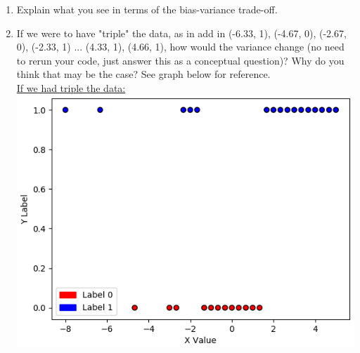 \documentclass[submit]{harvardml}
\begin{document}
\begin{problem}
\begin{enumerate}
\item Explain what you see in terms of the bias-variance trade-off.

\item If we were to have "triple" the data, as in add in (-6.33, 1), (-4.67, 0), (-2.67, 0), (-2.33, 1) ... (4.33, 1), (4.66, 1), how would the variance change (no need to rerun your code, just answer this 
  as a conceptual question)? Why do you think that may be the case? See graph below for reference. \\
  
\underline{If we had triple the data:} \\

\includegraphics[scale=0.45]{tripleddata.png}
  
\end{enumerate}

\end{problem}

\newpage
\end{document}
